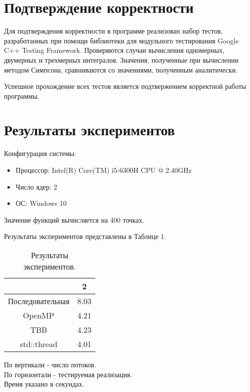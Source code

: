 \documentclass{report}
\begin{document}
\section*{Подтверждение корректности}
Для подтверждения корректности в программе реализован набор тестов, разработанных при помощи библиотеки для модульного тестирования Google C++ Testing Framework. Проверяются случаи вычисления одномерных, двумерных и трехмерных интегралов. Значения, полученные при вычислении методом Симпсона, сравниваются со значениями, полученным аналитически.
\par Успешное прохождение всех тестов является подтвержением корректной работы программы. 

\newpage

\section*{Результаты экспериментов}
Конфигурация системы:
\begin{itemize}
\item Процессор: Intel(R) Core(TM) i5-6300H CPU @ 2.40GHz
\item Число ядер: 2
\item ОС: Windows 10
\end{itemize}

\par Значение функций вычисляется на 400 точках. 
\par Результаты экспериментов представлены в Таблице 1.

\begin{table}[htbp]
        \centering
        \begin{tabular}{|c|c|}
            \hline
                             & 2 \\ \hline
            Последовательная & 8.03 \\ \hline
            OpenMP           & 4.21 \\ \hline
            TBB              & 4.23 \\ \hline
            std::thread      & 4.01 \\ \hline
        \end{tabular}
        \caption{Результаты экспериментов.}
        \label{tab:results}
        По вертикали - число потоков. \\
        По горизонтали - тестируемая реализация. \\
        Время указано в секундах.
    \end{table}
\end{document}

